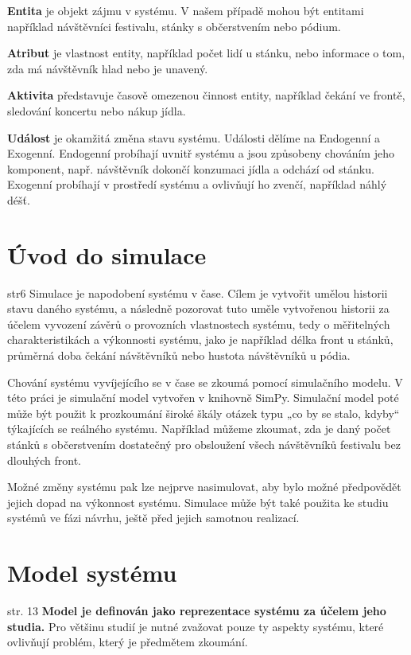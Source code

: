 \documentclass[12pt,a4paper]{article}
\begin{document}
\noindent \textbf{Entita} je objekt zájmu v systému. V našem případě mohou být entitami například návštěvníci festivalu, stánky s občerstvením nebo pódium.

\noindent \textbf{Atribut} je vlastnost entity, například počet lidí u stánku, nebo informace o tom, zda má návštěvník hlad nebo je unavený. 

\noindent \textbf{Aktivita} představuje časově omezenou činnost entity, například čekání ve frontě, sledování koncertu nebo nákup jídla.

\noindent \textbf{Událost} je okamžitá změna stavu systému. Události dělíme na Endogenní a Exogenní. Endogenní probíhají uvnitř systému a jsou způsobeny chováním jeho komponent, např. návštěvník dokončí konzumaci jídla a odchází od stánku. Exogenní probíhají v prostředí systému a ovlivňují ho zvenčí, například náhlý déšť.


\section{Úvod do simulace}  str6
Simulace je napodobení systému v čase. Cílem je vytvořit umělou historii stavu daného systému, a následně pozorovat tuto uměle vytvořenou historii za účelem vyvození závěrů o provozních vlastnostech systému, tedy o měřitelných charakteristikách a výkonnosti systému, jako je například délka front u stánků, průměrná doba čekání návštěvníků nebo hustota návštěvníků u pódia. 

Chování systému vyvíjejícího se v čase se zkoumá pomocí simulačního modelu. V této práci je simulační model vytvořen v knihovně SimPy. Simulační model poté může být použit k prozkoumání široké škály otázek typu „co by se stalo, kdyby“ týkajících se reálného systému. Například můžeme zkoumat, zda je daný počet stánků s občerstvením dostatečný pro obsloužení všech návštěvníků festivalu bez dlouhých front. 

Možné změny systému pak lze nejprve nasimulovat, aby bylo možné předpovědět jejich dopad na výkonnost systému. Simulace může být také použita ke studiu systémů ve fázi návrhu, ještě před jejich samotnou realizací.

\section{Model systému} str. 13
{\bf Model je definován jako reprezentace systému za účelem jeho studia.} Pro většinu studií je nutné zvažovat pouze ty aspekty systému, které ovlivňují problém, který je předmětem zkoumání. 
\end{document}
